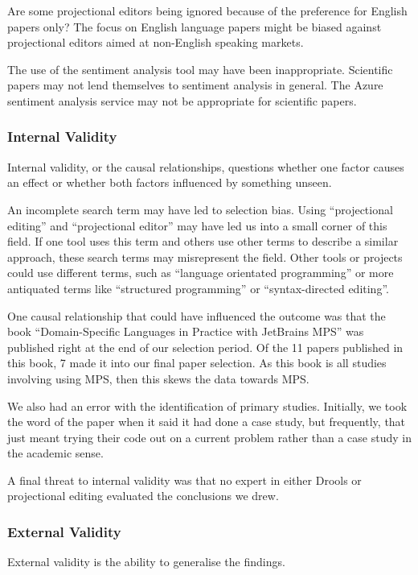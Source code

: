 Are some projectional editors being ignored because of the preference for English papers only?
The focus on English language papers might be biased against projectional editors aimed at non-English speaking markets.

The use of the sentiment analysis tool may have been inappropriate.
Scientific papers may not lend themselves to sentiment analysis in general.
The Azure sentiment analysis service may not be appropriate for scientific papers.

\subsubsection{Internal Validity}
Internal validity, or the causal relationships, questions whether one factor causes an effect or whether both factors influenced by something unseen.

An incomplete search term may have led to selection bias.  
Using ``projectional editing'' and ``projectional editor'' may have led us into a small corner of this field.
If one tool uses this term and others use other terms to describe a similar approach, these search terms may misrepresent the field.
Other tools or projects could use different terms, such as ``language orientated programming'' or more antiquated terms like ``structured programming'' or ``syntax-directed editing''.

One causal relationship that could have influenced the outcome was that the book ``Domain-Specific Languages in Practice with JetBrains MPS'' was published right at the end of our selection period.
Of the 11 papers published in this book, 7 made it into our final paper selection.
As this book is all studies involving using MPS, then this skews the data towards MPS.

We also had an error with the identification of primary studies. 
Initially, we took the word of the paper when it said it had done a case study, but frequently, that just meant trying their code out on a current problem rather than a case study in the academic sense.

A final threat to internal validity was that no expert in either Drools or projectional editing evaluated the conclusions we drew.

\subsubsection{External Validity}
External validity is the ability to generalise the findings.

